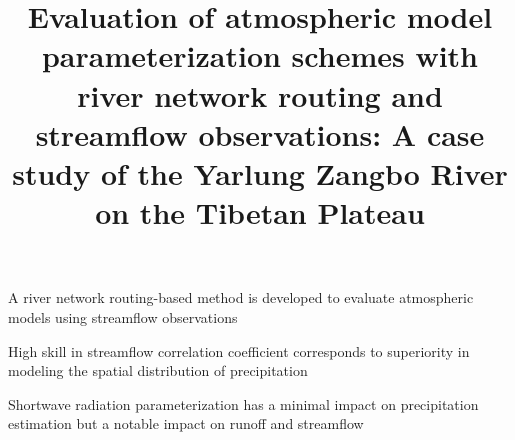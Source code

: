 \documentclass[draft]{agujournal2019}
\begin{document}
\title{Evaluation of atmospheric model parameterization schemes with river network routing and streamflow observations: A case study of the Yarlung Zangbo River on the Tibetan Plateau}





\begin{keypoints}
      \item A river network routing-based method is developed to evaluate atmospheric models using streamflow observations
      \item High skill in streamflow correlation coefficient corresponds to superiority in modeling the spatial distribution of precipitation
      \item Shortwave radiation parameterization has a minimal impact on precipitation estimation but a notable impact on runoff and streamflow
\end{keypoints}
\end{document}
